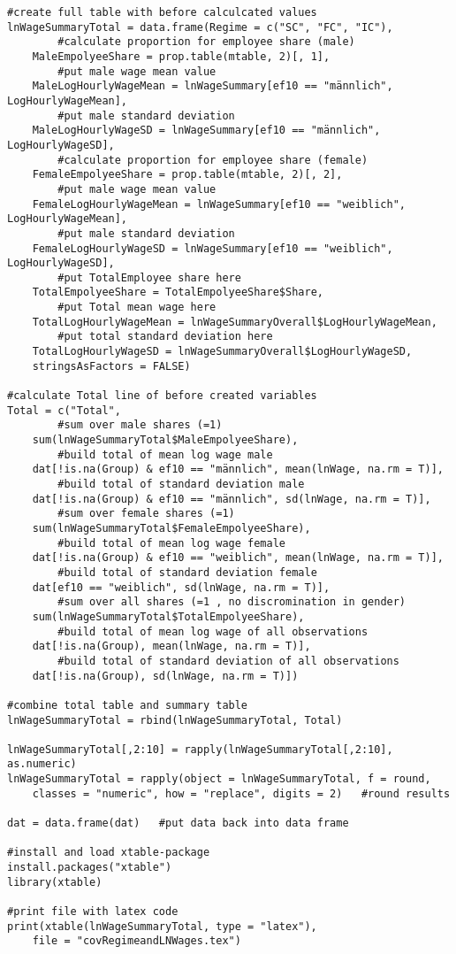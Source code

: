 \begin{lstlisting}
#create full table with before calculcated values 
lnWageSummaryTotal = data.frame(Regime = c("SC", "FC", "IC"),
		#calculate proportion for employee share (male)                                       
	MaleEmpolyeeShare = prop.table(mtable, 2)[, 1], 
		#put male wage mean value 
	MaleLogHourlyWageMean = lnWageSummary[ef10 == "männlich", LogHourlyWageMean], 
		#put male standard deviation   
	MaleLogHourlyWageSD = lnWageSummary[ef10 == "männlich", LogHourlyWageSD], 
		#calculate proportion for employee share (female)     
	FemaleEmpolyeeShare = prop.table(mtable, 2)[, 2],  
		#put male wage mean value                            
	FemaleLogHourlyWageMean = lnWageSummary[ef10 == "weiblich", LogHourlyWageMean],
		#put male standard deviation    
	FemaleLogHourlyWageSD = lnWageSummary[ef10 == "weiblich", LogHourlyWageSD],
		#put TotalEmployee share here      
	TotalEmpolyeeShare = TotalEmpolyeeShare$Share,           
		#put Total mean wage here                     
	TotalLogHourlyWageMean = lnWageSummaryOverall$LogHourlyWageMean, 
		#put total standard deviation here                 
	TotalLogHourlyWageSD = lnWageSummaryOverall$LogHourlyWageSD,                   
	stringsAsFactors = FALSE)

#calculate Total line of before created variables 
Total = c("Total",     
		#sum over male shares (=1)   
	sum(lnWageSummaryTotal$MaleEmpolyeeShare),
		#build total of mean log wage male                              
	dat[!is.na(Group) & ef10 == "männlich", mean(lnWage, na.rm = T)], 
		#build total of standard deviation male      
	dat[!is.na(Group) & ef10 == "männlich", sd(lnWage, na.rm = T)],
		#sum over female shares (=1)      
	sum(lnWageSummaryTotal$FemaleEmpolyeeShare),                          
		#build total of mean log wage female
	dat[!is.na(Group) & ef10 == "weiblich", mean(lnWage, na.rm = T)],     
		#build total of standard deviation female
	dat[ef10 == "weiblich", sd(lnWage, na.rm = T)],
		#sum over all shares (=1 , no discromination in gender)	                         
	sum(lnWageSummaryTotal$TotalEmpolyeeShare),                             
		#build total of mean log wage of all observations
	dat[!is.na(Group), mean(lnWage, na.rm = T)],                            
		#build total of standard deviation of all observations
	dat[!is.na(Group), sd(lnWage, na.rm = T)])                              

#combine total table and summary table
lnWageSummaryTotal = rbind(lnWageSummaryTotal, Total)  
 
lnWageSummaryTotal[,2:10] = rapply(lnWageSummaryTotal[,2:10], as.numeric)
lnWageSummaryTotal = rapply(object = lnWageSummaryTotal, f = round, 
	classes = "numeric", how = "replace", digits = 2)	#round results

dat = data.frame(dat)   #put data back into data frame

#install and load xtable-package
install.packages("xtable")
library(xtable)

#print file with latex code
print(xtable(lnWageSummaryTotal, type = "latex"), 
	file = "covRegimeandLNWages.tex") 

\end{lstlisting}

